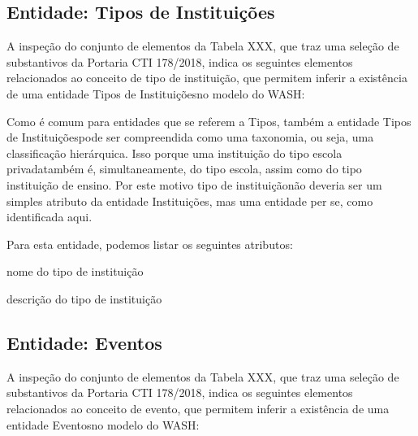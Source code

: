 \documentclass[
12pt,		%
openright,	%
twoside,  %
a4paper,			%
chapter=TITLE,		%
english,			%
french,				%
spanish,			%
brazil				%
]{USPSC-classe/USPSC}
\begin{document}
\subsection[Entidade: Tipos de Institui\c{c}\~oes]{Entidade: Tipos de Institui\c{c}\~oes}\label{Entidade: Tipos de Institui\c{c}\~oes}
A inspe\c{c}\~ao do conjunto de elementos da Tabela XXX, que traz uma sele\c{c}\~ao de substantivos da Portaria CTI 178/2018, indica os seguintes elementos relacionados ao conceito de \textquotedbl tipo de institui\c{c}\~ao\textquotedbl , que permitem inferir a exist\^encia de uma entidade \textquotedbl Tipos de Institui\c{c}\~oes\textquotedbl  no modelo do WASH:



\noindent\begin{center}\mbox{\centering{}}\end{center}


Como \'e comum para entidades que se referem a \textquotedbl Tipos\textquotedbl , tamb\'em a entidade \textquotedbl Tipos de Institui\c{c}\~oes\textquotedbl  pode ser compreendida como uma taxonomia, ou seja, uma classifica\c{c}\~ao hier\'arquica. Isso porque uma institui\c{c}\~ao do tipo \textquotedbl escola privada\textquotedbl  tamb\'em \'e, simultaneamente, do tipo \textquotedbl escola\textquotedbl , assim como do tipo \textquotedbl institui\c{c}\~ao de ensino\textquotedbl . Por este motivo \textquotedbl tipo de institui\c{c}\~ao\textquotedbl  n\~ao deveria ser um simples atributo da entidade \textquotedbl Institui\c{c}\~oes\textquotedbl , mas uma entidade per se, como identificada aqui.


Para esta entidade, podemos listar os seguintes atributos:



\begin{alineas}
\item nome do tipo de institui\c{c}\~ao
\item descri\c{c}\~ao do tipo de institui\c{c}\~ao
\end{alineas}

\subsection[Entidade: Eventos]{Entidade: Eventos}\label{Entidade: Eventos}
A inspe\c{c}\~ao do conjunto de elementos da Tabela XXX, que traz uma sele\c{c}\~ao de substantivos da Portaria CTI 178/2018, indica os seguintes elementos relacionados ao conceito de \textquotedbl evento\textquotedbl , que permitem inferir a exist\^encia de uma entidade \textquotedbl Eventos\textquotedbl  no modelo do WASH:
\end{document}
